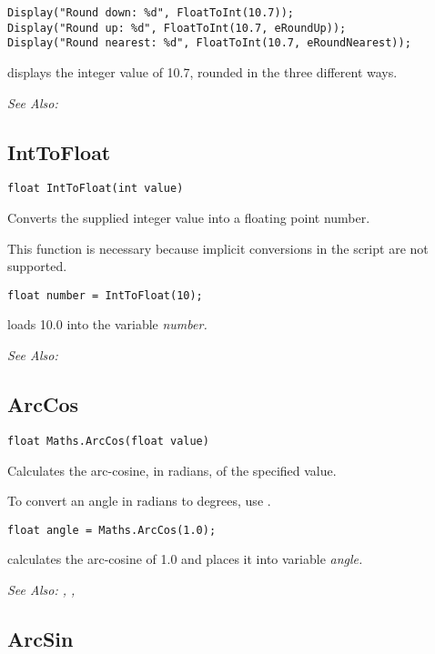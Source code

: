 \begin{verbatim}
Display("Round down: %d", FloatToInt(10.7));
Display("Round up: %d", FloatToInt(10.7, eRoundUp));
Display("Round nearest: %d", FloatToInt(10.7, eRoundNearest));
\end{verbatim}
displays the integer value of 10.7, rounded in the three different ways.

\it{See Also:} 


\subsection{IntToFloat}\label{IntToFloat}%

\begin{verbatim}
float IntToFloat(int value)
\end{verbatim}
Converts the supplied integer value into a floating point number.

This function is necessary because implicit conversions in the script are not supported.

\begin{verbatim}
float number = IntToFloat(10);
\end{verbatim}
loads 10.0 into the variable \it{number}.

\it{See Also:} 


\subsection{ArcCos}\label{Maths.ArcCos}%

\begin{verbatim}
float Maths.ArcCos(float value)
\end{verbatim}
Calculates the arc-cosine, in radians, of the specified value.

To convert an angle in radians to degrees, use .

\begin{verbatim}
float angle = Maths.ArcCos(1.0);
\end{verbatim}
calculates the arc-cosine of 1.0 and places it into variable \it{angle}.

\it{See Also:} ,
,


\subsection{ArcSin}\label{Maths.ArcSin}%

